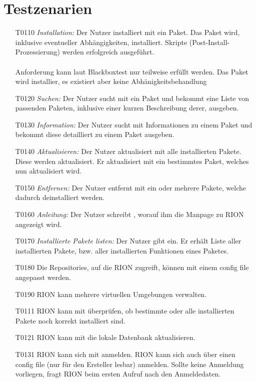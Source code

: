 \chapter{Testzenarien}
\begin{itemize}
	\item[T0110] \textit{Installation:}	Der Nutzer installiert mit  ein Paket. Das Paket wird, inklusive eventueller Abhängigkeiten, installiert. Skripte (Post-Install-Prozessierung) werden erfolgreich ausgeführt.\\\\
	Anforderung kann laut Blackboxtest nur teilweise erfüllt werden. Das Paket wird installier, es existiert aber keine Abhänigkeitsbehandlung
	\item[T0120] \textit{Suchen:} Der Nutzer sucht mit  ein Paket und bekommt eine Liste von passenden Paketen, inklusive einer kurzen Beschreibung derer, ausgeben.
	
	
	
	\item[T0130] \textit{Information:} Der Nutzer sucht mit  Informationen zu einem Paket und bekommt diese detailliert zu einem Paket ausgeben.
	\item[T0140] \textit{Aktualisieren:} Der Nutzer aktualisiert mit  alle installierten Pakete. Diese werden aktualisiert. Er aktualisiert mit  ein bestimmtes Paket, welches nun aktualisiert wird.
	\item[T0150] \textit{Entfernen:} Der Nutzer entfernt mit  ein oder mehrere Pakete, welche dadurch deinstalliert werden.
	\item[T0160] \textit{Anleitung:} Der Nutzer schreibt , worauf ihm die Manpage zu RION angezeigt wird.
	\item[T0170] \textit{Installierte Pakete listen:} Der Nutzer gibt  ein. Er erhält Liste aller installierten Pakete, bzw. aller installierten Funktionen eines Paketes.
	\item[T0180] Die Repositories, auf die RION zugreift, können mit einem config file angepasst werden.
	\item[T0190] RION kann mehrere virtuellen Umgebungen verwalten.
	\item[T0111] RION kann mit 	 überprüfen, ob bestimmte oder alle installierten Pakete noch korrekt installiert sind.
	\item[T0121] RION kann mit  die lokale Datenbank aktualisieren.
	\item[T0131] RION kann sich mit  anmelden. RION kann sich auch über einen config file (nur für den Ersteller lesbar) anmelden. Sollte keine Anmeldung vorliegen, fragt RION beim ersten Aufruf nach den Anmeldedaten.
\end{itemize}